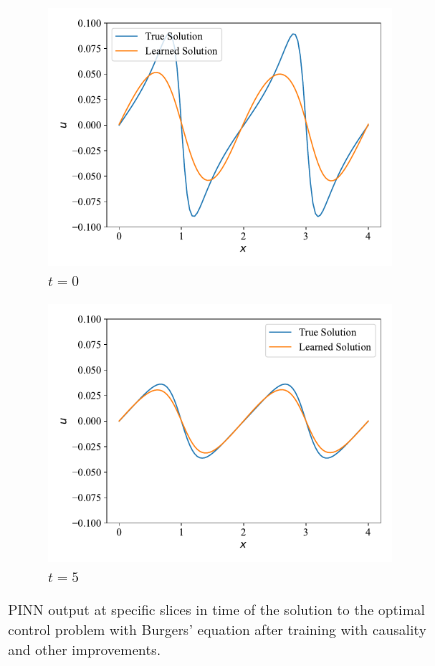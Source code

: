 \begin{figure}[H]
     \centering
     \begin{subfigure}[b]{0.45\textwidth}
         \centering
         \includegraphics[width=\textwidth]{Figures/AdvancedExperiments/InitialControlCausal/attempt1/burger_slice0.pdf}
         \caption{$t = 0$}
         \label{fig:burger_control_initial_slice0_attempt1}
     \end{subfigure}
     \hfill
     \begin{subfigure}[b]{0.45\textwidth}
         \centering
         \includegraphics[width=\textwidth]{Figures/AdvancedExperiments/InitialControlCausal/attempt1/burger_slice1.pdf}
         \caption{$t = 5$}
         \label{fig:burger_control_initial_slice1_attempt1}
     \end{subfigure}
    \caption{PINN output at specific slices in time of the solution to the optimal control problem with Burgers' equation after training with causality and other improvements.}
    \label{fig:burger_control_initial_slices_attempt1}
\end{figure}


